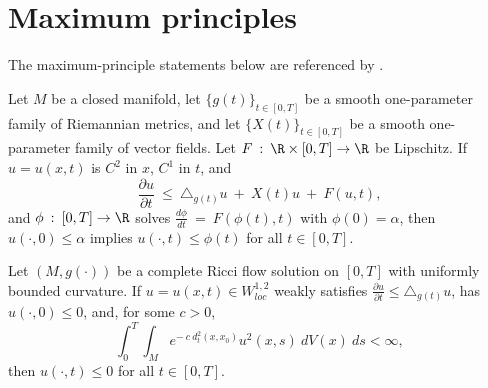 \section{Maximum principles} \label{maxprin}

The maximum-principle statements below are referenced by \cite{Chow-Lu-Ni}.

\begin{theorem}
  \label{thm:kl-maximum-principles-maximum-principles-theorem}

Let $M$ be a closed manifold, let $\{g(t)\}_{t \in [0,T]}$ be a smooth
one-parameter family of Riemannian metrics, and let $\{X(t)\}_{t \in [0,T]}$
be a smooth one-parameter family of vector fields. Let
$F \: : \: \R \times [0,T] \rightarrow \R$ be Lipschitz. If $u=u(x,t)$ is
$C^2$ in $x$, $C^1$ in $t$, and
\begin{equation}
\frac{\partial u}{\partial t} \: \le \: \triangle_{g(t)}u \: + \: X(t)u \: + \: F(u,t),
\end{equation}
and $\phi \: : \: [0,T] \rightarrow \R$ solves
$\frac{d\phi}{dt} \: = \: F(\phi(t),t)$ with $\phi(0)=\alpha$, then
$u(\cdot,0)\leq\alpha$ implies $u(\cdot,t)\leq\phi(t)$ for all
$t\in[0,T]$.
\end{theorem}

\begin{theorem}
  \label{thm:kl-maximum-principles-estimates-curvature}

Let $(M,g(\cdot))$ be a complete Ricci flow solution on $[0,T]$ with
uniformly bounded curvature. If $u=u(x,t)\in W^{1,2}_{loc}$ weakly satisfies
$\frac{\partial u}{\partial t}\leq\triangle_{g(t)}u$, has
$u(\cdot,0)\leq0$, and, for some $c>0$,
\begin{equation}
\int_0^T\int_M e^{-\:c\:d_t^2(x,x_0)}u^2(x,s)\:dV(x)\:ds<\infty,
\end{equation}
then $u(\cdot,t)\leq0$ for all $t\in[0,T]$.
\end{theorem}

